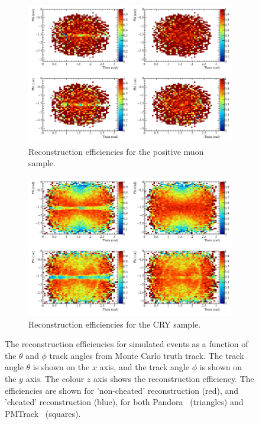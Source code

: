 \begin{figure}
  \centering
  \begin{subfigure}{0.8\textwidth}
    \centering
    \includegraphics[width=\textwidth]{Effic_AntiMuon_500V_All_PhiTheta}
    \caption{Reconstruction efficiencies for the positive muon sample.}
    \label{fig:SimEffic_ThetaPhi_AMu}
  \end{subfigure}
  \begin{subfigure}{0.8\textwidth}
    \centering
    \includegraphics[width=\textwidth]{Effic_Cosmics_500V_All_PhiTheta}
    \caption{Reconstruction efficiencies for the CRY sample.}
    \label{fig:SimEffic_ThetaPhi_CRY}
  \end{subfigure}
  \caption[The reconstruction efficiencies for simulated events as a function of the $\theta$ and $\phi$ track angles from Monte Carlo truth track.]
          {The reconstruction efficiencies for simulated events as a function of the $\theta$ and $\phi$ track angles from Monte Carlo truth track. The track angle $\theta$ is shown on the $x$ axis, and the track angle $\phi$ is shown on the $y$ axis. The colour $z$ axis shows the reconstruction efficiency. The efficiencies are shown for 'non-cheated' reconstruction (red), and 'cheated' reconstruction (blue), for both Pandora~\citep{Pandora} (triangles) and PMTrack~\citep{PMTrack} (squares).}
          \label{fig:SimEffic_ThetaPhi}
\end{figure}

